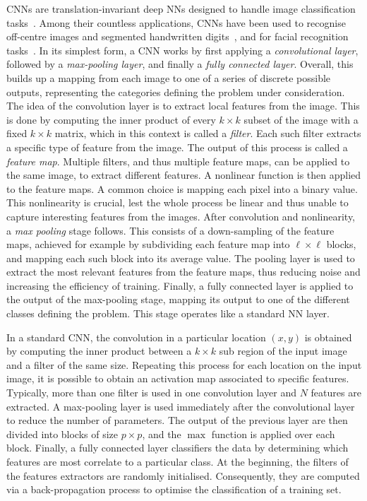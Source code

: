 \acp{CNN} are translation-invariant deep NNs designed to handle image classification tasks~\cite{lecun2015deep}. Among their countless applications, CNNs have been used to recognise off-centre images and segmented handwritten digits~\cite{simard2003best,ciresan2011flexible},
and for facial recognition tasks~\cite{matsugu2003subject}.
In its simplest form, a \ac{CNN} works by first applying a \emph{convolutional layer},
followed by a \emph{max-pooling layer}, and finally a \emph{fully connected layer}.
Overall, this builds up a mapping from each image to one of a series of discrete possible outputs, representing the categories defining the problem under consideration.
The idea of the convolution layer is to extract local features from the image.
This is done by computing the inner product of every $k\times k$ subset of the image with a fixed $k\times k$ matrix, which in this context is called a \emph{filter}. Each such filter extracts a specific type of feature from the image. The output of this process is called a \emph{feature map}. Multiple filters, and thus multiple feature maps, can be applied to the same image, to extract different features.
A nonlinear function is then applied to the feature maps. A common choice is mapping each pixel into a binary value. This nonlinearity is crucial, lest the whole process be linear and thus unable to capture interesting features from the images.
After convolution and nonlinearity, a \emph{max pooling} stage follows. This consists of a down-sampling of the feature maps, achieved for example by subdividing each feature map into $\ell\times \ell$ blocks, and mapping each such block into its average value.
The pooling layer is used to extract the most relevant features from the feature maps, thus reducing noise and increasing the efficiency of training.
Finally, a fully connected layer is applied to the output of the max-pooling stage, mapping its output to one of the different classes defining the problem.
This stage operates like a standard NN layer.

In a standard \ac{CNN}, the convolution in a particular location $(x,y)$ is obtained by computing the inner product between a $k \times k$ sub region of the input image and a filter of the same size. Repeating this process for each location on the input image, it is possible to obtain an activation map associated to specific features. Typically, more than one filter is used in one convolution layer and $N$ features are extracted.
A max-pooling layer is used immediately after the convolutional layer to reduce the number of parameters. The output of the previous layer are then divided into blocks of size $p \times p$, and the $\max$ function is applied over each block.
Finally, a fully connected layer classifiers the data by determining which features are most correlate to a particular class.
At the beginning, the filters of the features extractors are randomly initialised. Consequently, they are computed via a back-propagation process to optimise the classification of a training set.

